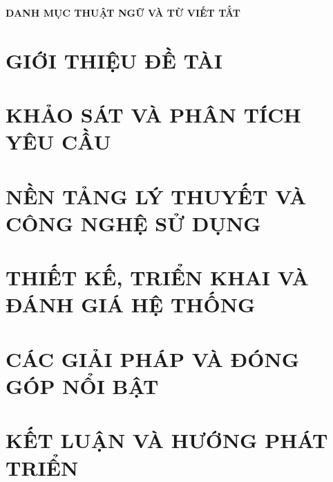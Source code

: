 \documentclass[a4paper,13pt,3p,twoside]{report}
\theoremstyle{definition}
\begin{document}
\newpage
\begin{center}
    \textbf{\MakeUppercase{DANH MỤC THUẬT NGỮ VÀ TỪ VIẾT TẮT}}
\end{center}


% 


\newpage
{}

\pagestyle{fancy}
\fancyhf{}
\fancyhead[RE, LO]{\leftmark}
\fancyfoot[RE, LO]{\thepage}

\chapter{GIỚI THIỆU ĐỀ TÀI}
\label{chapter:Introduction}

\newpage
\chapter{KHẢO SÁT VÀ PHÂN TÍCH YÊU CẦU}
\label{chapter:Related_works}



\newpage
\chapter{NỀN TẢNG LÝ THUYẾT VÀ CÔNG NGHỆ SỬ DỤNG}
\label{chapter:Methodology}


\newpage
\chapter{THIẾT KẾ, TRIỂN KHAI VÀ ĐÁNH GIÁ HỆ THỐNG}
\label{chapter:Experiment}


\newpage
\chapter{CÁC GIẢI PHÁP VÀ ĐÓNG GÓP NỔI BẬT}
\label{chapter:SolutionAndContribution}

\newpage
\chapter{KẾT LUẬN VÀ HƯỚNG PHÁT TRIỂN} %
\label{chapter:conclusion}

\end{document}
